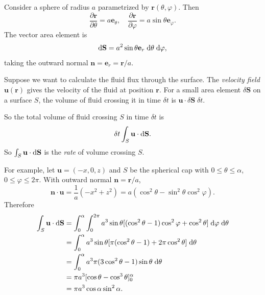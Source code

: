 \documentclass[a4paper]{article}
\begin{document}
\begin{eg}
  Consider a sphere of radius $a$ parametrized by $\mathbf{r}(\theta, \varphi)$. Then
  \[
    \frac{\partial \mathbf{r}}{\partial \theta} = a\mathbf{e}_\theta,\quad \frac{\partial \mathbf{r}}{\partial \varphi} = a\sin \theta \mathbf{e}_\varphi.
  \]
  The vector area element is
  \[
    \mathrm{d} \mathbf{S} = a^2\sin \theta \mathbf{e}_r \;\mathrm{d} \theta\; \mathrm{d}\varphi,
  \]
  taking the outward normal $\mathbf{n} = \mathbf{e}_r = \mathbf{r}/a$.

  Suppose we want to calculate the fluid flux through the surface. The \emph{velocity field} $\mathbf{u}(\mathbf{r})$ gives the velocity of the fluid at position $\mathbf{r}$. For a small area element $\delta \mathbf{S}$ on a surface $S$, the volume of fluid crossing it in time $\delta t$ is $\mathbf{u}\cdot \delta \mathbf{S}\; \delta t$.
  \begin{center}
  \end{center}
  So the total volume of fluid crossing $S$ in time $\delta t$ is
  \[
    \delta t\int_S \mathbf{u}\cdot \mathrm{d} \mathbf{S}.
  \]
  So $\int_S \mathbf{u}\cdot \mathrm{d} \mathbf{S}$ is the \emph{rate} of volume crossing $S$.

  For example, let $\mathbf{u} = (-x, 0, z)$ and $S$ be the spherical cap with $0 \leq \theta \leq \alpha$, $0 \leq \varphi \leq 2\pi$. With outward normal $\mathbf{n} = \mathbf{r}/a$,
  \[
    \mathbf{n}\cdot \mathbf{u} = \frac{1}{a}(-x^2 + z^2) = a(\cos^2 \theta - \sin^2\theta\cos^2\varphi).
  \]
  Therefore
  \begin{align*}
    \int_S \mathbf{u}\cdot \mathrm{d} \mathbf{S} &= \int_0^\alpha \int_0^{2\pi} a^3 \sin \theta[(\cos^2\theta - 1) \cos^2 \varphi + \cos^2 \theta]\;\mathrm{d} \varphi\;\mathrm{d} \theta\\
    &= \int_0^\alpha a^3\sin \theta[\pi(\cos^2\theta - 1) + 2\pi \cos^2\theta]\; \mathrm{d} \theta\\
    &=\int_0^\alpha a^3\pi(3\cos^2 \theta - 1)\sin \theta\;\mathrm{d} \theta\\
    &= \pi a^3[\cos\theta - \cos^3 \theta]_0^\alpha\\
    &= \pi a^3 \cos \alpha\sin^2 \alpha.
  \end{align*}
\end{eg}
\end{document}
